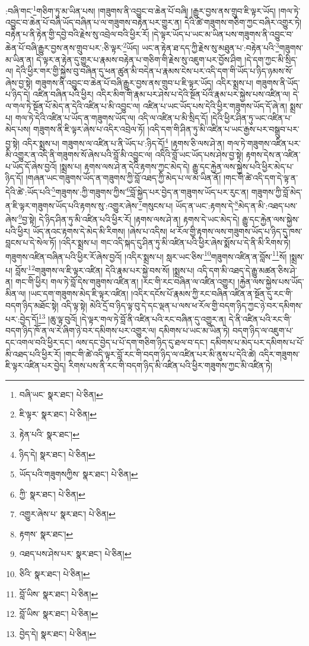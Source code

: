 :བཞི་གང་\footnote{བཞི་ཡང་  སྣར་ཐང་།  པེ་ཅིན། }གཅིག་ཏུ་མ་ཡིན་པས། །གཟུགས་ནི་འབྱུང་བ་ཆེན་པོ་བཞི། །རྒྱུར་བྱས་ནས་གྲུབ་ཇི་ལྟར་ཡོད། །གལ་ཏེ་འབྱུང་བ་ཆེན་པོ་བཞི་ཡོད་བཞིན་པ་ལ་གཟུགས་བརྟེན་པར་གྱུར་ན། དེའི་ཚེ་གཟུགས་གཅིག་ཀྱང་བཞིར་འགྱུར་ཏེ། བརྟེན་པ་ནི་རྟེན་གྱི་དབྱེ་བའི་རྗེས་སུ་འབྲེལ་བའི་ཕྱིར་རོ། །དེ་ལྟར་ཡོད་པ་ཡང་མ་ཡིན་པས་གཟུགས་ནི་འབྱུང་བ་ཆེན་པོ་བཞི་རྒྱུར་བྱས་ནས་གྲུབ་པར་:ཅི་ལྟར་\footnote{ཇི་ལྟར་  སྣར་ཐང་།  པེ་ཅིན། }ཡོད། ཡང་ན་རྟེན་ཐ་དད་ཀྱི་རྗེས་སུ་མཐུན་པ་:བརྟེན་པའི་\footnote{རྟེན་པའི་  སྣར་ཐང་། }གཟུགས་མ་ཡིན་ན། དེ་ལྟར་ན་རྟེན་དུ་གྱུར་པ་རྣམས་བརྟེན་པ་གཅིག་གི་རྗེས་སུ་འཇུག་པར་བྱོས་ཤིག །དེ་དག་ཀྱང་མི་སྲིད་ལ། དེའི་ཕྱིར་གར་གྱི་སྐྱེས་བུ་བཞིན་དུ་ཕན་ཚུན་མི་བདེན་པ་རྣམས་ངེས་པར་འདི་དག་གི་ཡོད་པ་ཉིད་ཉམས་སོ་ཞེས་བྱ་སྟེ། གཟུགས་ནི་འབྱུང་བ་ཆེན་པོ་བཞི་རྒྱུར་བྱས་ནས་གྲུབ་པ་ཇི་ལྟར་ཡོད། འདིར་སྨྲས་པ། གཟུགས་ནི་ཡོད་པ་ཉིད་དེ། འཛིན་བཞིན་པའི་ཕྱིར། འདིར་མིག་གི་རྣམ་པར་ཤེས་པ་དེའི་སྔོན་པོའི་རྣམ་པར་སྐྱེས་པས་འཛིན་ལ། དེ་ལ་གལ་ཏེ་སྔོན་པོ་མེད་ན་དེའི་འཛིན་པ་མི་འབྱུང་ལ། འཛིན་པ་ཡང་ཡོད་པས་དེའི་ཕྱིར་གཟུགས་ཡོད་དོ་ཞེ་ན། སྨྲས་པ། གལ་ཏེ་དེའི་འཛིན་པ་ཡོད་ན་གཟུགས་ཡོད་ལ། འདི་ལ་འཛིན་པ་མི་སྲིད་དོ། །དེའི་ཕྱིར་ཤིན་ཏུ་ཡང་འཛིན་པ་མེད་པས། གཟུགས་ནི་ཇི་ལྟར་ཞེས་པ་འདིར་འབྲེལ་ཏོ། །འདི་དག་གི་ཤིན་ཏུ་མི་འཛིན་པ་ཡང་རྒྱས་པར་བསྒྲུབ་པར་བྱ་སྟེ། འདིར་སྨྲས་པ། གཟུགས་ལ་འཛིན་པ་ནི་ཡོད་པ་:ཉིད་དོ།\footnote{ཉིད་དེ།  སྣར་ཐང་།  པེ་ཅིན། } །རྟགས་ཅི་ལས་ཤེ་ན། གལ་ཏེ་གཟུགས་འཛིན་པར་མི་འགྱུར་ན་འདི་ནི་གཟུགས་སོ་ཞེས་པའི་བློ་མི་འབྱུང་ལ། འདིའི་བློ་ཡང་ཡོད་པས་ཤེས་བྱ་སྟེ། རྟགས་དེས་ན་འཛིན་པ་ཡོད་དོ་ཞེས་བྱའོ། །སྨྲས་པ། རྟགས་ལས་ཤེ་ན་དེའི་རྟགས་ཀྱང་མེད་དེ། རྒྱུ་དང་རྐྱེན་ལས་སྐྱེས་པའི་ཕྱིར་མེད་པ་ཉིད་དོ། །གཞན་ཡང་གཟུགས་ཡོད་ན་གཟུགས་ཀྱི་བློ་འཐད་ཀྱི་མེད་པ་ལ་མ་ཡིན་ནོ། །གང་གི་ཚེ་འདི་དག་དེ་ལྟ་ན་དེའི་ཚེ་:ཡོད་པའི་\footnote{ཡོད་པའི་གཟུགསཀྱིས་  སྣར་ཐང་།  པེ་ཅིན། }གཟུགས་:ཀྱི་གཟུགས་ཀྱིས་\footnote{ཀྱི་  སྣར་ཐང་།  པེ་ཅིན། }བློ་སྐྱེད་པར་བྱེད་ན་གཟུགས་ཡོད་པར་རུང་ན། གཟུགས་ཀྱི་བློ་མེད་ན་ཇི་ལྟར་གཟུགས་ཡོད་པའི་རྟགས་སུ་:འགྱུར་ཞེས་\footnote{འགྱུར་ཞེས་པ་  སྣར་ཐང་།  པེ་ཅིན། }གསུངས་པ། ཡོད་ན་ཡང་:རྟགས་དེ་\footnote{རྟགས་  སྣར་ཐང་། }མེད་ན་མི་:འཐད་པས་ཞེས་\footnote{འཐད་པས་ཤེས་པར་  སྣར་ཐང་།  པེ་ཅིན། }བྱ་སྟེ། དེ་ཉིད་ཤིན་ཏུ་མི་འཛིན་པའི་ཕྱིར་རོ། །རྟགས་ལས་ཤེ་ན། རྟགས་དེ་ཡང་མེད་དེ། རྒྱུ་དང་རྐྱེན་ལས་སྐྱེས་པའི་ཕྱིར། ཡོད་ནའང་རྟགས་དེ་མེད་མི་རིགས། །ཞེས་པ་འདིས། ཕ་རོལ་གྱི་རྟགས་ལས་གཟུགས་ཡོད་པ་ཉིད་དུ་ཁས་བླངས་པ་དེ་སེལ་ཏོ། །འདིར་སྨྲས་པ། གང་འདི་སྐད་དུ་ཤིན་ཏུ་མི་འཛིན་པའི་ཕྱིར་ཞེས་སྨོས་པ་དེ་ནི་མི་རིགས་ཏེ། གཟུགས་འཛིན་བཞིན་པའི་ཕྱིར་རོ་ཞེས་བྱའོ། །འདིར་སྨྲས་པ། སླར་ཡང་ཅིས་\footnote{ཅིའི་  སྣར་ཐང་།  པེ་ཅིན། }གཟུགས་འཛིན་ན་བློས་\footnote{བློ་ཡིས་  སྣར་ཐང་།  པེ་ཅིན། }སོ། །སྨྲས་པ། བློས་\footnote{བློ་ཡིས་  སྣར་ཐང་།  པེ་ཅིན། }གཟུགས་ལ་ཇི་ལྟར་འཛིན། དེའི་རྣམ་པར་སྐྱེ་བས་སོ། །སྨྲས་པ། འདི་དག་མི་འཐད་དེ་རྒྱུ་མཚན་ཅིས་ཤེ་ན། གང་གི་ཕྱིར། གལ་ཏེ་བློ་དེས་གཟུགས་འཛིན་ན། །རང་གི་རང་བཞིན་ལ་འཛིན་འགྱུར། །རྐྱེན་ལས་སྐྱེས་པས་ཡོད་མིན་ལ། །ཡང་དག་གཟུགས་མེད་ཇི་ལྟར་འཛིན། །འདིར་དངོས་པོ་རྣམས་ཀྱི་རང་བཞིན་འཛིན་ན་སྔོན་དུ་རང་གི་བདག་ཉིད་མཐོང་སྟེ། འདི་ལྟ་སྟེ། མེའི་དྲོ་བ་ཉིད་ལྟ་བུ་དེ་དང་ལྡན་པ་ལས་ཕ་རོལ་གྱི་བདག་ཉིད་ཀྱང་ཉེ་བར་དམིགས་པར་:བྱེད་དོ།\footnote{བྱེད་དེ།  སྣར་ཐང་།  པེ་ཅིན། } །ཆུ་ལྟ་བུའོ། །དེ་ལྟར་གལ་ཏེ་བློ་ནི་འཛིན་པའི་རང་བཞིན་དུ་འགྱུར་ན། དེ་ནི་འཛིན་པའི་རང་གི་བདག་ཉིད་ཁོ་ན་ལ་རེ་ཞིག་ཉེ་བར་དམིགས་པར་འགྱུར་ལ། དམིགས་པ་ཡང་མ་ཡིན་ཏེ། བདག་ཉིད་ལ་འཇུག་པ་དང་འགལ་བའི་ཕྱིར་དང་། ལས་དང་བྱེད་པ་པོ་དག་གཅིག་ཉིད་དུ་ཐལ་བ་དང་། དམིགས་པ་མེད་པར་དམིགས་པ་པོ་མི་འཐད་པའི་ཕྱིར་རོ། །གང་གི་ཚེ་འདི་ལྟར་བློ་རང་གི་བདག་ཉིད་ལ་འཛིན་པར་མི་ནུས་པ་དེའི་ཚེ། འདིར་གཟུགས་ཇི་ལྟར་འཛིན་པར་བྱེད། རིགས་པས་ནི་རང་གི་བདག་ཉིད་མི་འཛིན་པའི་ཕྱིར་གཟུགས་ཀྱང་མི་འཛིན་ཏེ། 